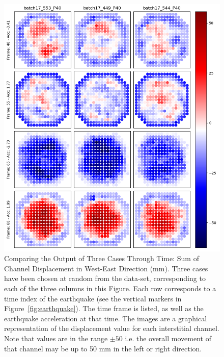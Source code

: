 \begin{figure}[p]
	\centering
	\includegraphics[scale=0.45]{Figures/results1.png}
	\caption{Comparing the Output of Three Cases Through Time: Sum of Channel Displacement in West-East Direction (mm). Three cases have been chosen at random from the data-set, corresponding to each of the three columns in this Figure. Each row corresponds to a time index of the earthquake (see the vertical markers in Figure~\ref{fig:earthquake}). The time frame is listed, as well as the earthquake acceleration at that time. The images are a graphical representation of the displacement value for each interstitial channel. Note that values are in the range $ \pm 50 $ i.e. the overall movement of that channel may be up to 50 mm in the left or right direction.}
	\label{fig:results1}
\end{figure}

